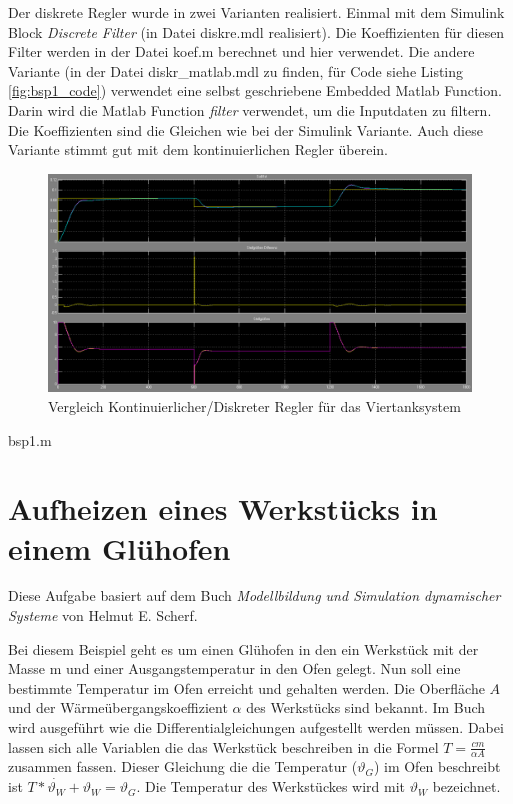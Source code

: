 \documentclass[a4paper]{article}
\begin{document}
Der diskrete Regler wurde in zwei Varianten realisiert. Einmal mit dem Simulink Block \emph{Discrete Filter} (in Datei diskre.mdl realisiert). Die Koeffizienten für diesen Filter werden in der Datei koef.m berechnet und hier verwendet. Die andere Variante (in der Datei diskr\_matlab.mdl zu finden, für Code siehe Listing \ref{fig:bsp1_code}) verwendet eine selbst geschriebene Embedded Matlab Function. Darin wird die Matlab Function \emph{filter} verwendet, um die Inputdaten zu filtern. Die Koeffizienten sind die Gleichen wie bei der Simulink Variante. Auch diese Variante stimmt gut mit dem kontinuierlichen Regler überein.

\begin{figure}[H]
    \centering
    \includegraphics[width=\linewidth]{erg_bsp1.png}
    \caption{Vergleich Kontinuierlicher/Diskreter Regler für das Viertanksystem}
    \label{fig:bsp1}
\end{figure}

 {bsp1.m}

\section{Aufheizen eines Werkstücks in einem Glühofen}

Diese Aufgabe basiert auf dem Buch \emph{Modellbildung und Simulation dynamischer Systeme} von Helmut E. Scherf.

Bei diesem Beispiel geht es um einen Glühofen in den ein Werkstück mit der Masse m und einer Ausgangstemperatur in den Ofen gelegt. Nun soll eine bestimmte Temperatur im Ofen erreicht und gehalten werden. Die Oberfläche $A$ und der Wärmeübergangskoeffizient $\alpha$ des Werkstücks sind bekannt. Im Buch wird ausgeführt wie die Differentialgleichungen aufgestellt werden müssen. Dabei lassen sich alle Variablen die das Werkstück beschreiben in die Formel $T= \frac{c m}{\alpha A}$ zusammen fassen. Dieser Gleichung die die Temperatur ($\vartheta_G$) im Ofen beschreibt ist $T*\dot{\vartheta_W}+\vartheta_W = \vartheta_G$. Die Temperatur des Werkstückes wird mit $\vartheta_W$ bezeichnet. 
\end{document}
